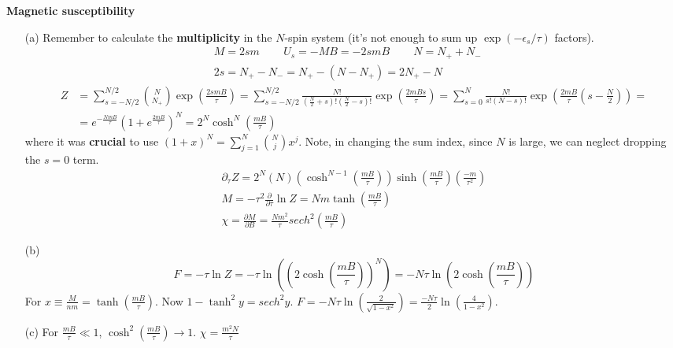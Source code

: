 \documentclass[twoside]{amsart}
\theoremstyle{plain}
\theoremstyle{definition}
\newcommand{\solutionhead}[1]
  {
   \noindent{\small\bf Solution #1.}
   }
\begin{document}
\solutionhead{2} \textbf{Magnetic susceptibility} 
\begin{itemize}
\item[(a)] Remember to calculate the \textbf{multiplicity} in the $N$-spin system (it's not enough to sum up $\exp{(-\epsilon_s /\tau) }$ factors).  
\[
\begin{gathered}
  M = 2sm \quad \quad \, U_s = - MB = -2sm B \quad \quad \, N = N_+ + N_- \quad \, \\ 
  2s = N_+ - N_- = N_+ - (N - N_+ ) = 2N_+ - N
\end{gathered}
\] 
\[
\begin{aligned}
  Z & = \sum_{s=-N/2}^{N/2} \binom{N}{N_+} \exp{ \left( \frac{ 2 s m B}{\tau} \right) } = \sum_{ s = -N/2}^{N/2} \frac{ N!}{ \left( \frac{N}{2} + s \right)! \left( \frac{N}{2} -s \right)! } \exp{ \left( \frac{2 m B s}{\tau} \right) } = \sum_{s=0}^N \frac{N! }{ s! (N-s)! } \exp{ \left( \frac{2mB}{\tau} \left( s - \frac{N}{2} \right) \right) } = \\
  & = e^{-\frac{NmB}{\tau} } (1 + e^{\frac{2mB}{\tau}} )^N = 2^N \cosh^N{\left( \frac{mB}{\tau} \right) }
\end{aligned}
\]
where it was \textbf{crucial} to use $(1+ x)^N = \sum_{j=1}^N \binom{N}{j} x^j$.  Note, in changing the sum index, since $N$ is large, we can neglect dropping the $s=0$ term.  
\[
\begin{gathered}
  \partial_{\tau} Z = 2^N (N) (\cosh^{N-1}{\left( \frac{mB}{\tau} \right) } ) \sinh{ \left( \frac{mB}{\tau} \right) } \left( \frac{-m}{\tau^2 }\right)  \\
  M  = -\tau^2 \frac{\partial }{\partial \tau} \ln{Z} = N m \tanh{ \left( \frac{mB}{\tau } \right) } \\ 
\chi = \frac{\partial M}{\partial B} = \frac{Nm^2}{\tau} sech^2{\left( \frac{mB}{\tau} \right) }
\end{gathered}
\]
\item[(b)]
\[
F = -\tau \ln{Z} = -\tau \ln{ \left( (2\cosh{ \left( \frac{mB}{\tau} \right) } )^N \right)} = -N\tau \ln{ (2 \cosh{ \left( \frac{mB}{\tau} \right) } )}
\]
For $x \equiv \frac{ M}{ nm } = \tanh{ \left( \frac{mB}{\tau} \right) }$.  Now $1 - \tanh^2{y} = sech^2{y}$.  $F = - N \tau \ln{ \left( \frac{2}{ \sqrt{ 1 - x^2 } } \right) } = \frac{- N\tau}{2} \ln{ \left( \frac{4}{1 - x^2} \right) }$.  
\item[(c)] For $\frac{mB}{\tau} \ll 1$, $\cosh^2{\left( \frac{mB}{\tau} \right)} \to 1$.  $\boxed{ \chi = \frac{m^2 N}{\tau} }$
\end{itemize}
\end{document}
